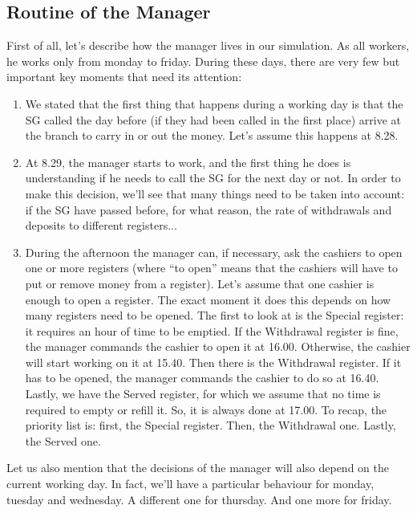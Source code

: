 \documentclass{article}
\begin{document}
\subsection{Routine of the Manager}
First of all, let's describe how the manager lives in our simulation. As all workers, he works only from monday to friday. During these days, there are very few but important key moments that need its attention:
\begin{enumerate}
    \item We stated that the first thing that happens during a working day is that the SG called the day before (if they had been called in the first place) arrive at the branch to carry in or out the money. Let's assume this happens at 8.28.
    \item At 8.29, the manager starts to work, and the first thing he does is understanding if he needs to call the SG for the next day or not. In order to make this decision, we'll see that many things need to be taken into account: if the SG have passed before, for what reason, the rate of withdrawals and deposits to different registers...
    \item During the afternoon the manager can, if necessary, ask the cashiers to open one or more registers (where ``to open'' means that the cashiers will have to put or remove money from a register). Let's assume that one cashier is enough to open a register. The exact moment it does this depends on how many registers need to be opened. The first to look at is the Special register: it requires an hour of time to be emptied. If the Withdrawal register is fine, the manager commands the cashier to open it at 16.00. Otherwise, the cashier will start working on it at 15.40. Then there is the Withdrawal register. If it has to be opened, the manager commands the cashier to do so at 16.40. Lastly, we have the Served register, for which we assume that no time is required to empty or refill it. So, it is always done at 17.00. To recap, the priority list is: first, the Special register. Then, the Withdrawal one. Lastly, the Served one.
\end{enumerate}
Let us also mention that the decisions of the manager will also depend on the current working day. In fact, we'll have a particular behaviour for monday, tuesday and wednesday. A different one for thursday. And one more for friday.
\end{document}
